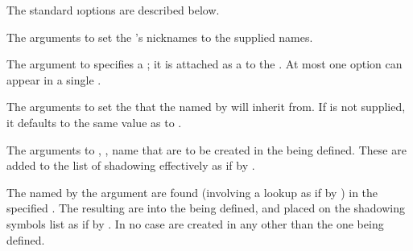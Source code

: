 The standard \i{options} are described below. 

\beginlist
{}

The arguments to  set the 's nicknames to the
supplied names.
 

The argument to  specifies a ;
it is attached as a  to the .
At most one  option 
can appear in a single  .


The arguments to  set the  that the 
named by 
will inherit from. If  is not supplied,
it defaults to the same  value as  to
.
 

The arguments to , , name  
that are to be created in the  being defined.
These  are added to the list of shadowing
 effectively as if by .
 

The  named by the argument 
are found (involving a lookup as if by )
in the specified .  The resulting 
are  into the  being defined, and 
placed on the shadowing symbols list as if by .
In no case are  created in any 
other than the one being defined.
 
